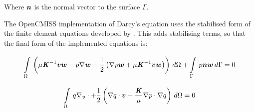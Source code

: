 Where $\boldsymbol{n}$ is the normal vector to the surface $\Gamma$.

The OpenCMISS implementation of Darcy's equation uses the stabilised form of the finite element
equations developed by \cite{masud:2002}. This adds stabilising terms, so that the final form
of the implemented equations is:

\begin{equation}
  \gint{\Omega}{}{\left(\mu \inverse{\tensor{K}} \vectr{v} \vectr{w} - p \gradient{}{\vectr{w}} - %
  \frac{1}{2} \left( \gradient{}{p} \vectr{w} + \mu \inverse{\tensor{K}} \vectr{v} \vectr{w} \right) \right)}{\Omega} + %
  \gint{\Gamma}{}{p \vectr{n} \vectr{w}}{\Gamma}= 0
\end{equation}

\begin{equation}
  \gint{\Omega}{}{q \divergence{\vectr{v}} + %
  \frac{1}{2} \left( \dotprod{\gradient{}{q}}{\vectr{v}} + %
  \frac{\tensor{K}}{\mu} \dotprod{\gradient{}{p}}{\gradient{}{q}} \right)}{\Omega}= 0
\end{equation}

